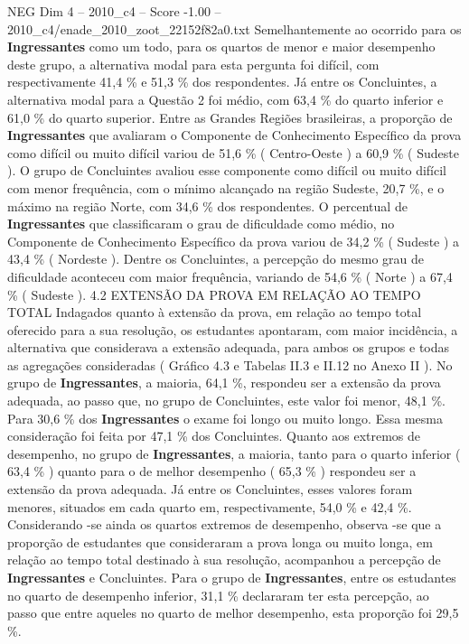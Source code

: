 \begin{textsample}{NEG Dim 4 – 2010\_c4 – Score -1.00 – 2010\_c4/enade\_2010\_zoot\_22152f82a0.txt}
Semelhantemente ao ocorrido para os \textbf{Ingressantes} como um todo, para os quartos de menor e maior desempenho deste grupo, a alternativa modal para esta pergunta foi difícil, com respectivamente 41,4 \% e 51,3 \% dos respondentes.
Já entre os Concluintes, a alternativa modal para a Questão 2 foi médio, com 63,4 \% do quarto inferior e 61,0 \% do quarto superior.
Entre as Grandes Regiões brasileiras, a proporção de \textbf{Ingressantes} que avaliaram o Componente de Conhecimento Específico da prova como difícil ou muito difícil variou de 51,6 \% ( Centro-Oeste ) a 60,9 \% ( Sudeste ).
O grupo de Concluintes avaliou esse componente como difícil ou muito difícil com menor frequência, com o mínimo alcançado na região Sudeste, 20,7 \%, e o máximo na região Norte, com 34,6 \% dos respondentes.
O percentual de \textbf{Ingressantes} que classificaram o grau de dificuldade como médio, no Componente de Conhecimento Específico da prova variou de 34,2 \% ( Sudeste ) a 43,4 \% ( Nordeste ).
Dentre os Concluintes, a percepção do mesmo grau de dificuldade aconteceu com maior frequência, variando de 54,6 \% ( Norte ) a 67,4 \% ( Sudeste ). 4.2 EXTENSÃO DA PROVA EM RELAÇÃO AO TEMPO TOTAL Indagados quanto à extensão da prova, em relação ao tempo total oferecido para a sua resolução, os estudantes apontaram, com maior incidência, a alternativa que considerava a extensão adequada, para ambos os grupos e todas as agregações consideradas ( Gráfico 4.3 e Tabelas II.3 e II.12 no Anexo II ).
No grupo de \textbf{Ingressantes}, a maioria, 64,1 \%, respondeu ser a extensão da prova adequada, ao passo que, no grupo de Concluintes, este valor foi menor, 48,1 \%.
Para 30,6 \% dos \textbf{Ingressantes} o exame foi longo ou muito longo.
Essa mesma consideração foi feita por 47,1 \% dos Concluintes.
Quanto aos extremos de desempenho, no grupo de \textbf{Ingressantes}, a maioria, tanto para o quarto inferior ( 63,4 \% ) quanto para o de melhor desempenho ( 65,3 \% ) respondeu ser a extensão da prova adequada.
Já entre os Concluintes, esses valores foram menores, situados em cada quarto em, respectivamente, 54,0 \% e 42,4 \%.
Considerando -se ainda os quartos extremos de desempenho, observa -se que a proporção de estudantes que consideraram a prova longa ou muito longa, em relação ao tempo total destinado à sua resolução, acompanhou a percepção de \textbf{Ingressantes} e Concluintes.
Para o grupo de \textbf{Ingressantes}, entre os estudantes no quarto de desempenho inferior, 31,1 \% declararam ter esta percepção, ao passo que entre aqueles no quarto de melhor desempenho, esta proporção foi 29,5 \%.

\end{textsample}
